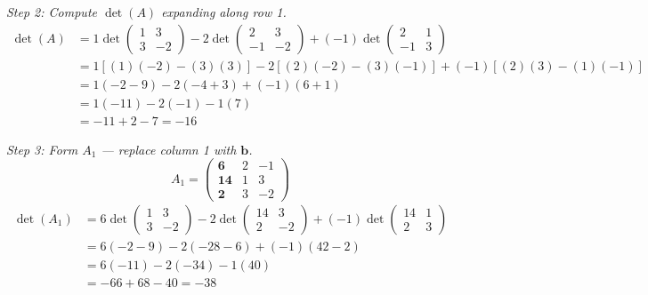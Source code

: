 \documentclass[12pt,a4paper]{article}
\begin{document}
\textit{Step 2: Compute \(\det(A)\) expanding along row 1.}
\begin{align*}
\det(A) &= 1\det\begin{pmatrix}1&3\\3&-2\end{pmatrix}
          - 2\det\begin{pmatrix}2&3\\-1&-2\end{pmatrix}
          + (-1)\det\begin{pmatrix}2&1\\-1&3\end{pmatrix} \\
&= 1[(1)(-2)-(3)(3)] - 2[(2)(-2)-(3)(-1)] + (-1)[(2)(3)-(1)(-1)] \\
&= 1(-2-9) - 2(-4+3) + (-1)(6+1) \\
&= 1(-11) - 2(-1) - 1(7) \\
&= -11 + 2 - 7 = -16
\end{align*}

\textit{Step 3: Form \(A_1\) --- replace column 1 with \(\mathbf{b}\).}
\[
A_1 = \begin{pmatrix}\mathbf{6}&2&-1\\\mathbf{14}&1&3\\\mathbf{2}&3&-2\end{pmatrix}
\]
\begin{align*}
\det(A_1) &= 6\det\begin{pmatrix}1&3\\3&-2\end{pmatrix}
            - 2\det\begin{pmatrix}14&3\\2&-2\end{pmatrix}
            + (-1)\det\begin{pmatrix}14&1\\2&3\end{pmatrix} \\
&= 6(-2-9) - 2(-28-6) + (-1)(42-2) \\
&= 6(-11) - 2(-34) - 1(40) \\
&= -66 + 68 - 40 = -38
\end{align*}
\end{document}
